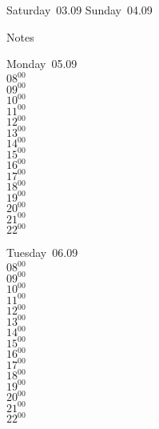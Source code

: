 \documentclass[11pt,a4paper]{book}\usepackage[]{graphicx}\usepackage[]{color}
\begin{document}
\begin{weekendbox}
  Saturday~03.09
  \tcblower
  Sunday~04.09
\end{weekendbox} %
\begin{notebox}
  Notes
\end{notebox}
\clearpage
\begin{headerbox}
\end{headerbox}
\begin{weekdaybox}
  Monday~05.09\\
  { 
  \vfill
  $08^{00}$\\
$09^{00}$\\
$10^{00}$\\
$11^{00}$\\
$12^{00}$\\
$13^{00}$\\
$14^{00}$\\
$15^{00}$\\
$16^{00}$\\
$17^{00}$\\
$18^{00}$\\
$19^{00}$\\
$20^{00}$\\
$21^{00}$\\
$22^{00}$\\
  }
\end{weekdaybox}
\begin{weekdaybox}
  Tuesday~06.09\\
  { 
  \vfill
  $08^{00}$\\
$09^{00}$\\
$10^{00}$\\
$11^{00}$\\
$12^{00}$\\
$13^{00}$\\
$14^{00}$\\
$15^{00}$\\
$16^{00}$\\
$17^{00}$\\
$18^{00}$\\
$19^{00}$\\
$20^{00}$\\
$21^{00}$\\
$22^{00}$\\
  }
\end{weekdaybox}
\end{document}

